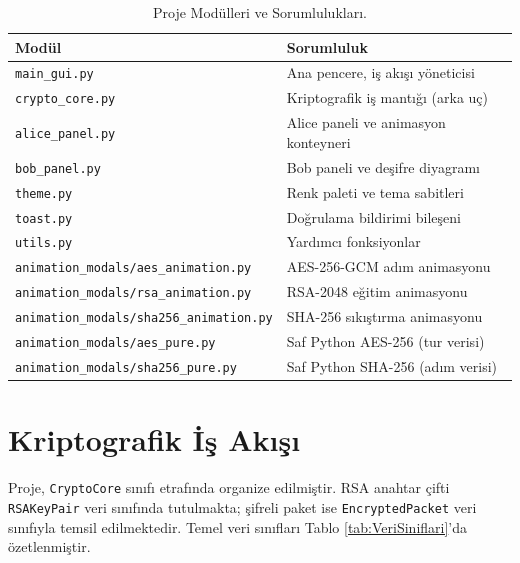 \begin{table}[t]
	\caption{Proje Modülleri ve Sorumlulukları.}
	\centering
	\begin{tabular}{|l|l|}
		\hline \textbf{Modül} & \textbf{Sorumluluk} \\
		\hline \texttt{main\_gui.py} & Ana pencere, iş akışı yöneticisi \\
		\hline \texttt{crypto\_core.py} & Kriptografik iş mantığı (arka uç) \\
		\hline \texttt{alice\_panel.py} & Alice paneli ve animasyon konteyneri \\
		\hline \texttt{bob\_panel.py} & Bob paneli ve deşifre diyagramı \\
		\hline \texttt{theme.py} & Renk paleti ve tema sabitleri \\
		\hline \texttt{toast.py} & Doğrulama bildirimi bileşeni \\
		\hline \texttt{utils.py} & Yardımcı fonksiyonlar \\
		\hline \texttt{animation\_modals/aes\_animation.py} & AES-256-GCM adım animasyonu \\
		\hline \texttt{animation\_modals/rsa\_animation.py} & RSA-2048 eğitim animasyonu \\
		\hline \texttt{animation\_modals/sha256\_animation.py} & SHA-256 sıkıştırma animasyonu \\
		\hline \texttt{animation\_modals/aes\_pure.py} & Saf Python AES-256 (tur verisi) \\
		\hline \texttt{animation\_modals/sha256\_pure.py} & Saf Python SHA-256 (adım verisi) \\
		\hline
	\end{tabular}
	\label{tab:Moduller}
\end{table}

\section{Kriptografik İş Akışı}

Proje, \texttt{CryptoCore} sınıfı etrafında organize edilmiştir. RSA anahtar çifti \texttt{RSAKeyPair} veri sınıfında tutulmakta; şifreli paket ise \texttt{EncryptedPacket} veri sınıfıyla temsil edilmektedir. Temel veri sınıfları Tablo \ref{tab:VeriSiniflari}'da özetlenmiştir.

